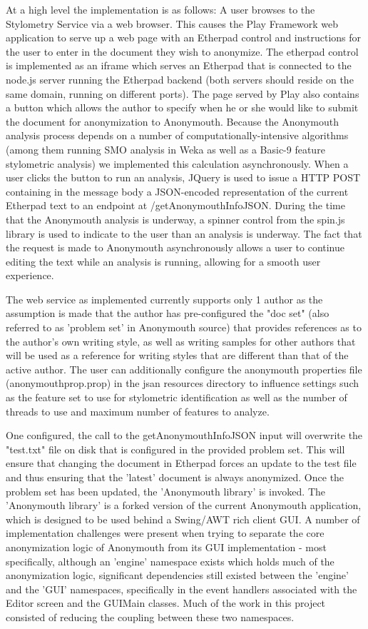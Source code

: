 \documentclass[letterpaper]{article}
\begin{document}
At a high level the implementation is as follows: A user browses to
the Stylometry Service via a web browser. This causes the Play
Framework web application to serve up a web page with an Etherpad control
and instructions for the user to enter in the document they wish to
anonymize. The etherpad control is implemented as an iframe which
serves an Etherpad that is connected to the node.js server running the
Etherpad backend (both servers should reside on the same domain,
running on different ports). The page served by Play also contains a
button which allows the author to specify when he or she would like to
submit the document for anonymization to Anonymouth. Because the
Anonymouth analysis process depends on a number of
computationally-intensive algorithms (among them running SMO analysis
in Weka as well as a Basic-9 feature stylometric analysis) we
implemented this calculation asynchronously. When a user clicks the
button to run an analysis, JQuery is used to issue a HTTP POST
containing in the message body a JSON-encoded
representation of the current Etherpad text to an endpoint at
/getAnonymouthInfoJSON. During the time that the Anonymouth analysis
is underway, a spinner control from the spin.js library is used to
indicate to the user than an analysis is underway. The fact that the
request is made to Anonymouth asynchronously allows a user to continue
editing the text while an analysis is running, allowing for a smooth
user experience.

The web service as implemented currently supports only 1 author as the assumption is
made that the author has pre-configured the "doc set" (also referred
to as 'problem set' in Anonymouth source) that provides references as
to the author's own writing style, as well as writing samples for
other authors that will be used as a reference for writing styles that
are different than that of the active author. The user can
additionally configure the anonymouth properties file
(anonymouthprop.prop) in the jsan resources directory to influence
settings such as the feature set to use for stylometric identification
as well as the number of threads to use and maximum number of features
to analyze.

One configured, the call to the getAnonymouthInfoJSON input will
overwrite the "test.txt" file on disk that is configured in the provided problem
set. This will ensure that changing the document in Etherpad forces an
update to the test file and thus ensuring that the 'latest' document
is always anonymized. Once the problem set has been updated, the
'Anonymouth library' is invoked. The 'Anonymouth library' is a forked
version of the current Anonymouth application, which is designed to be
used behind a Swing/AWT rich client GUI. A number of implementation
challenges were present when trying to separate the core anonymization
logic of Anonymouth from its GUI implementation - most specifically,
although an 'engine' namespace exists which holds much of the
anonymization logic, significant dependencies still existed between
the 'engine' and the 'GUI' namespaces, specifically in the event
handlers associated with the Editor screen and the GUIMain classes. Much of the work in this
project consisted of reducing the coupling between these two
namespaces.
\end{document}
